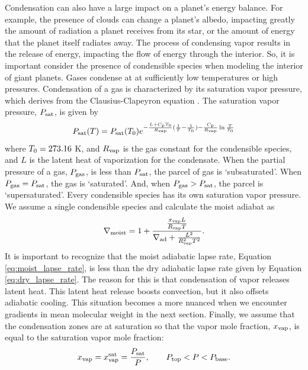 \documentclass[11pt]{ucscthesisbs}
\begin{document}
Condensation can also have a large impact on a planet's energy balance. For example, the presence of clouds can change a planet's albedo, impacting greatly the amount of radiation a planet receives from its star, or the amount of energy that the planet itself radiates away. The process of condensing vapor results in the release of energy, impacting the flow of energy through the interior. So, it is important consider the presence of condensible species when modeling the interior of giant planets. Gases condense at at sufficiently low temperatures or high pressures. Condensation of a gas is characterized by its saturation vapor pressure, which derives from the Clausius-Clapeyron equation \citep{sanchez_2011}. The saturation vapor pressure, $P_{\rm sat}$, is given by 
\begin{equation}
  P_{\rm sat}(T) = P_{\rm sat}(T_{\rm 0})e^{-\frac{L + C_{\rm p}T_{\rm 0}}{R_{\rm vap}}(\frac{1}{T} - \frac{1}{T_{\rm 0}}) -\frac{C_{\rm p}}{R_{\rm vap}}\ln{\frac{T}{T_{\rm 0}}}}
  \label{eq:saturation_vapor_pressure}
\end{equation}{}
where $T_{\rm 0} = 273.16$ K, and $R_{\rm vap}$ is the gas constant for the condensible species, and $L$ is the latent heat of vaporization for the condensate. When the partial pressure of a gas, $P_{\rm gas}$, is less than $P_{\rm sat}$, the parcel of gas is `subsaturated'. When $P_{\rm gas} = P_{\rm sat}$, the gas is `saturated'. And, when $P_{\rm gas} > P_{\rm sat}$, the parcel is `supersaturated'. Every condensible species has its own saturation vapor pressure. We assume a single condensible species and calculate the moist adiabat as \citep{sanchez_2011} 
\begin{equation}
  \nabla_{\rm moist} = 1 + \frac{\frac{x_{\rm vap} L}{R_{\rm vap}T}}{\nabla_{\rm ad} + \frac{L^2}{R_{\rm vap}^2 T^2}}.
  \label{eq:moist_lapse_rate}
\end{equation}
It is important to recognize that the moist adiabatic lapse rate, Equation \ref{eq:moist_lapse_rate}, is less than the dry adiabatic lapse rate given by Equation \ref{eq:dry_lapse_rate}. The reason for this is that condensation of vapor releases latent heat. This latent heat release boosts convection, but it also offsets adiabatic cooling. This situation becomes a more nuanced when we encounter gradients in mean molecular weight in the next section. Finally, we assume that the condensation zones are at saturation so that the vapor mole fraction, $x_{\rm vap}$, is equal to the saturation vapor mole fraction:
\begin{equation}
x_{\rm vap} = x_{\rm vap}^{\rm sat} = \frac{P_{\rm sat}}{P}, \qquad P_{\rm top} < P < P_{\rm base}.
\end{equation}
\end{document}
